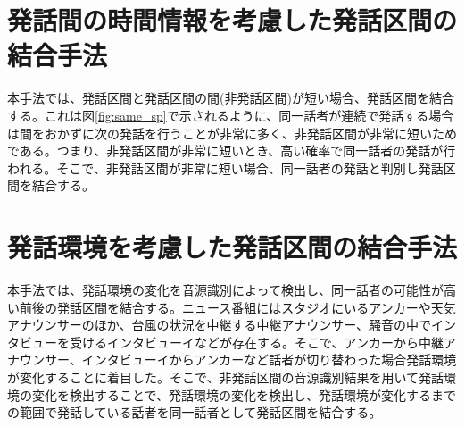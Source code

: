 \section{発話間の時間情報を考慮した発話区間の結合手法}
本手法では、発話区間と発話区間の間(非発話区間)が短い場合、発話区間を結合する。これは図\ref{fig:same_sp}で示されるように、同一話者が連続で発話する場合は間をおかずに次の発話を行うことが非常に多く、非発話区間が非常に短いためである。つまり、非発話区間が非常に短いとき、高い確率で同一話者の発話が行われる。そこで、非発話区間が非常に短い場合、同一話者の発話と判別し発話区間を結合する。

\section{発話環境を考慮した発話区間の結合手法}
本手法では、発話環境の変化を音源識別によって検出し、同一話者の可能性が高い前後の発話区間を結合する。ニュース番組にはスタジオにいるアンカーや天気アナウンサーのほか、台風の状況を中継する中継アナウンサー、騒音の中でインタビューを受けるインタビューイなどが存在する。そこで、アンカーから中継アナウンサー、インタビューイからアンカーなど話者が切り替わった場合発話環境が変化することに着目した。そこで、非発話区間の音源識別結果を用いて発話環境の変化を検出することで、発話環境の変化を検出し、発話環境が変化するまでの範囲で発話している話者を同一話者として発話区間を結合する。\par
